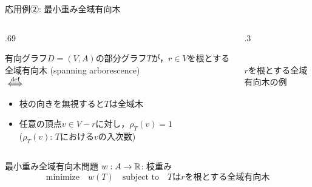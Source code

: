 \documentclass[14pt,aspectratio=169,xcolor=dvipsnames,table,onlytextwidth,dvipdfmx]{beamer}
\begin{document}
\begin{frame}{応用例②: 最小重み全域有向木}
    \small
    \begin{columns}
    \begin{column}{.69\textwidth}
    \begin{definition}
        有向グラフ$D = (V, A)$の部分グラフ$T$が，$r \in V$を根とする\alert{全域有向木 (spanning arborescence)}\\ 
        $\overset{\text{def}}{\iff}$
        \begin{itemize}
            \item 枝の向きを無視すると$T$は全域木
            \item 任意の頂点$v \in V - r$に対し，$\rho_T(v) = 1$ \\ 
            {\hfill\footnotesize ($\rho_T(v)$: $T$における$v$の入次数)}
        \end{itemize}
    \end{definition}
    \end{column}
    \begin{column}{.3\textwidth}
        \centering
        \\
        \footnotesize $r$を根とする全域有向木の例
    \end{column}
    \end{columns}

    \begin{block}{最小重み全域有向木問題}
        $w: A \to \mathbb{R}$: 枝重み
        \[
            \text{minimize} \quad w(T) \quad \text{subject to} \quad \text{$T$は$r$を根とする全域有向木}    
        \]
    \end{block}
\end{frame}
\end{document}
